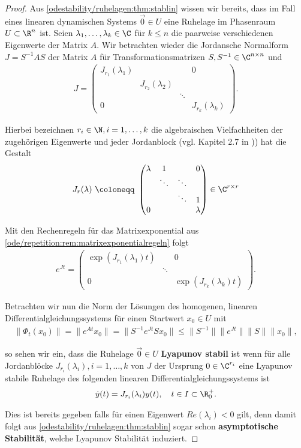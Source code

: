 \documentclass[letterpaper,10pt,german]{jupyterBook}
\begin{document}
\begin{proof}
 Aus \cref{odestability/ruhelagen:thm:stablin} wissen wir bereits, dass im Fall eines linearen dynamischen Systems \(\vec{0} \in U\) eine Ruhelage im Phasenraum \(U \subset \R^n\) ist.
Seien \(\lambda_1, \ldots, \lambda_k \in \C\) für \(k \leq n\) die paarweise verschiedenen Eigenwerte der Matrix \(A\).
Wir betrachten wieder die Jordansche Normalform \(J = S^{-1}AS\) der Matrix \(A\) für Transformationsmatrizen \(S,S^{-1} \in \C^{n \times n}\) und
\begin{align*}
J=
\begin{pmatrix}
J_{r_1}(\lambda_1)& & & 0\\
 & J_{r_2}(\lambda_2) & & \\
 & & \ddots & \\
 0 & & & J_{r_k}(\lambda_k)
\end{pmatrix}.
\end{align*}
\par
Hierbei bezeichnen \(r_i \in \N, i=1,\ldots, k\) die algebraischen Vielfachheiten der zugehörigen Eigenwerte und jeder Jordanblock (vgl. Kapitel 2.7 in \cite{Ten21})) hat die Gestalt
\begin{align*}
 J_r(\lambda) \ \coloneqq \ \begin{pmatrix}
\lambda & 1 & & 0\\
 & \ddots & \ddots & \\
 & & \ddots & 1\\
 0 & & & \lambda
 \end{pmatrix} \in \C^{r\times r}
\end{align*}
\par
Mit den Rechenregeln für das Matrixexponential aus \cref{ode/repetition:rem:matrixexponentialregeln} folgt
\begin{align*}
e^{Jt} = \begin{pmatrix}
\exp{(J_{r_1}(\lambda_1)t)} & & 0\\
 & \ddots & \\
 0& & \exp{(J_{r_k}(\lambda_k)t)}
 \end{pmatrix}.
\end{align*}
\par
Betrachten wir nun die Norm der Lösungen des homogenen, linearen Differentialgleichungssystems für einen Startwert \(x_0 \in U\) mit
\begin{align*}
\| \Phi_t(x_0) \| = \|e^{At}x_0\| = \|S^{-1}e^{Jt}S x_0\| \leq \|S^{-1}\| \|e^{Jt}\| \|S\| \|x_0\|,
\end{align*}
\par
so sehen wir ein, dass die Ruhelage \(\vec{0} \in U\) \textbf{Lyapunov stabil} ist wenn für alle Jordanblöcke \(J_{r_i}(\lambda_i), i=1,\ldots,k\) von \(J\) der Ursprung \(0\in \C^{r_i}\) eine Lyapunov stabile Ruhelage des folgenden linearen Differentialgleichungssystems ist
\begin{align*}
 \dot{y}(t) = J_{r_i}(\lambda_i) y(t), \quad t \in I \subset \R^+_0.
\end{align*}
\par
Dies ist bereits gegeben falls für einen Eigenwert \(Re(\lambda_i)<0\) gilt, denn damit folgt aus \cref{odestability/ruhelagen:thm:stablin} sogar schon \textbf{asymptotische Stabilität}, welche Lyapunov Stabilität induziert.


\end{proof}
\end{document}
